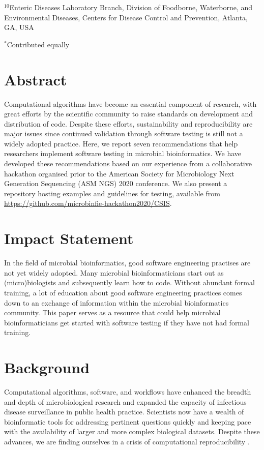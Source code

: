 $^{10}$Enteric Diseases Laboratory Branch, Division of Foodborne, Waterborne, and Environmental Diseases, Centers for Disease Control and Prevention, Atlanta, GA, USA

$^*$Contributed equally

\section{Abstract} \label{sec:ch8_abstract}

Computational algorithms have become an essential component of research, with great efforts by the scientific community to raise standards on development and distribution of code. Despite these efforts, sustainability and reproducibility are major issues since continued validation through software testing is still not a widely adopted practice. Here, we report seven recommendations that help researchers implement software testing in microbial bioinformatics. We have developed these recommendations based on our experience from a collaborative hackathon organised prior to the American Society for Microbiology Next Generation Sequencing (ASM NGS) 2020 conference. We also present a repository hosting examples and guidelines for testing, available from \url{https://github.com/microbinfie-hackathon2020/CSIS}.


\section{Impact Statement}

In the field of microbial bioinformatics, good software engineering practises are not yet widely adopted. Many microbial bioinformaticians start out as (micro)biologists and subsequently learn how to code. Without abundant formal training, a lot of education about good software engineering practices comes down to an exchange of information within the microbial bioinformatics community. This paper serves as a resource that could help microbial bioinformaticians get started with software testing if they have not had formal training.

\section{Background}

Computational algorithms, software, and workflows have enhanced the breadth and depth of microbiological research and expanded the capacity of infectious disease surveillance in public health practice. Scientists now have a wealth of bioinformatic tools for addressing pertinent questions quickly and keeping pace with the availability of larger and more complex biological datasets. Despite these advances, we are finding ourselves in a crisis of computational reproducibility \cite{stodden_empirical_2018}.

